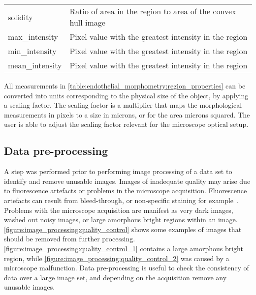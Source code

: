 \begin{table}[htbp]
\begin{tabular}{p{4cm} p{10cm}}
    solidity            & Ratio of area in the region to area of the convex hull image \\
    max\_intensity      & Pixel value with the greatest intensity in the region \\
    min\_intensity      & Pixel value with the greatest intensity in the region \\
    mean\_intensity     & Pixel value with the greatest intensity in the region \\
    \bottomrule
\end{tabular}
\end{table}

All measurements in \autoref{table:endothelial_morphometry:region_properties} can be converted into units corresponding to the physical size of the object, by applying a scaling factor. The scaling factor is a multiplier that maps the morphological measurements in pixels to a size in microns, or for the area microns squared. The user is able to adjust the scaling factor relevant for the microscope optical setup.

\subsection{Data pre-processing}
\label{endothelial_morphometry:image_processing:data_pre-processing}
A step was performed prior to performing image processing of a data set to identify and remove unusable images. Images of inadequate quality may arise due to fluorescence artefacts or problems in the microscope acquisition. Fluorescence artefacts can result from bleed-through, or non-specific staining for example~\cite{Waters2009}. Problems with the microscope acquisition are manifest as very dark images, washed out noisy images, or large amorphous bright regions within an image. \autoref{figure:image_processing:quality_control} shows some examples of images that should be removed from further processing. \autoref{figure:image_processing:quality_control_1} contains a large amorphous bright region, while \autoref{figure:image_processing:quality_control_2} was caused by a microscope malfunction. Data pre-processing is useful to check the consistency of data over a large image set, and depending on the acquisition remove any unusable images.

